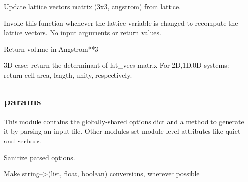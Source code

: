 \documentclass[letterpaper,10pt,english]{sphinxmanual}
\begin{document}

\begin{fulllineitems}
\label{\detokenize{globals:Globals.lattice.update_lat_vecs}}
Update lattice vectors matrix (3x3, angstrom) from \sphinxquotedblleft{}lattice\sphinxquotedblright{}.

Invoke this function whenever the lattice variable is changed to recompute
the lattice vectors. No input arguments or return values.

\end{fulllineitems}


\begin{fulllineitems}
\label{\detokenize{globals:Globals.lattice.volume}}
Return volume in Angstrom**3

3D case: return the determinant of lat\_vecs matrix
For 2D,1D,0D systems: return cell area, length, unity,
respectively.

\end{fulllineitems}



\subsection{params}
\label{\detokenize{globals:module-Globals.params}}\label{\detokenize{globals:params}}
This module contains the globally-shared options dict and a method to
generate it by parsing an input file. Other modules set module-level attributes
like \sphinxquotedblleft{}quiet\sphinxquotedblright{} and \sphinxquotedblleft{}verbose\sphinxquotedblright{}.

\begin{fulllineitems}
\label{\detokenize{globals:Globals.params.convert_params}}
Sanitize parsed options.

Make string--\textgreater{}(list, float, boolean) conversions, wherever possible

\end{fulllineitems}

\end{document}
